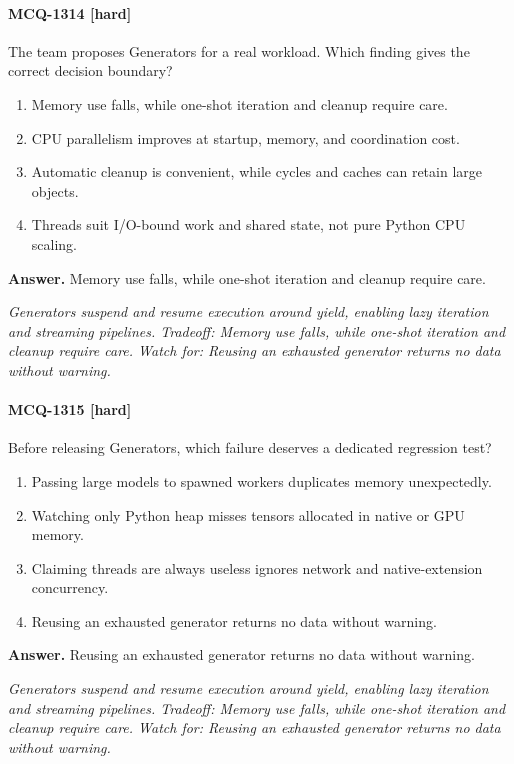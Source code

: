 \paragraph{MCQ-1314 [hard]} The team proposes Generators for a real workload. Which finding gives the correct decision boundary?
\begin{enumerate}[label=\Alph*.]
\item Memory use falls, while one-shot iteration and cleanup require care.
\item CPU parallelism improves at startup, memory, and coordination cost.
\item Automatic cleanup is convenient, while cycles and caches can retain large objects.
\item Threads suit I/O-bound work and shared state, not pure Python CPU scaling.
\end{enumerate}
\noindent\textbf{Answer.} Memory use falls, while one-shot iteration and cleanup require care.
\par\textit{Generators suspend and resume execution around yield, enabling lazy iteration and streaming pipelines. Tradeoff: Memory use falls, while one-shot iteration and cleanup require care. Watch for: Reusing an exhausted generator returns no data without warning.}
\paragraph{MCQ-1315 [hard]} Before releasing Generators, which failure deserves a dedicated regression test?
\begin{enumerate}[label=\Alph*.]
\item Passing large models to spawned workers duplicates memory unexpectedly.
\item Watching only Python heap misses tensors allocated in native or GPU memory.
\item Claiming threads are always useless ignores network and native-extension concurrency.
\item Reusing an exhausted generator returns no data without warning.
\end{enumerate}
\noindent\textbf{Answer.} Reusing an exhausted generator returns no data without warning.
\par\textit{Generators suspend and resume execution around yield, enabling lazy iteration and streaming pipelines. Tradeoff: Memory use falls, while one-shot iteration and cleanup require care. Watch for: Reusing an exhausted generator returns no data without warning.}
